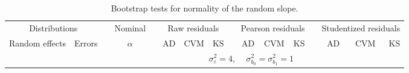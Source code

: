 \begin{table}[ht]
\begin{scriptsize}
\begin{center}
\begin{tabular}{ll p{.1cm} c p{.1cm} rrr p{.1cm} rrr p{.1cm} rrr}
   \hline
\end{tabular}
\end{center}
\end{scriptsize}
\end{table}


\begin{table}[ht]
\caption{\label{tab:bootb1}Bootstrap tests for normality of the random slope.}
\begin{scriptsize}
\begin{center}
\begin{tabular}{ll p{.1cm} c p{.1cm} rrr p{.1cm} rrr p{.1cm} rrr}
  \hline
  \multicolumn{2}{c}{Distributions}& & Nominal & &  \multicolumn{3}{c}{Raw residuals} & & \multicolumn{3}{c}{Pearson residuals} & & \multicolumn{3}{c}{Studentized residuals}\\ \cline{1-2} \cline{6-8} \cline{10-12} \cline{14-16}
  Random effects & Errors & & $\alpha$ & & AD & CVM & KS & & AD & CVM & KS & & AD & CVM & KS \\ 
   \hline
& && && \multicolumn{9}{c}{$\sigma_{\varepsilon}^2 = 4$, \ \ $\sigma_{b_0}^2 = \sigma_{b_1}^2 = 1$} \\ \cline{6-16}


\end{tabular}
\end{center}
\end{scriptsize}
\end{table}

